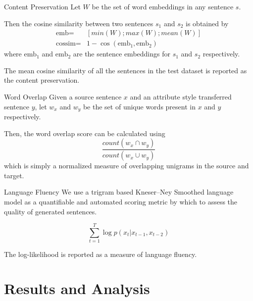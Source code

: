 \documentclass[aspectratio=169]{beamer}
\begin{document}
\begin{frame}{Content Preservation}
	Let $W$ be the set of word embeddings in any sentence $s$.

	Then the cosine similarity between two sentences $s_1$ and $s_2$ is obtained by
	\begin{align*}
		\text{emb} =    & [min(W);max(W);mean(W)]              \\
		\text{cossim} = & 1 - \cos(\text{emb}_1, \text{emb}_2)
	\end{align*}
	where $\text{emb}_1$ and $\text{emb}_2$ are the sentence embeddings for $s_1$ and $s_2$ respectively.

	The mean cosine similarity of all the sentences in the test dataset is reported as the content preservation.
\end{frame}

\begin{frame}{Word Overlap}
	Given a source sentence $x$ and an attribute style transferred sentence $y$, let $w_x$ and $w_y$ be the set of unique words present in $x$ and $y$ respectively.

	Then, the word overlap score can be calculated using
	\begin{equation*}
		\frac{count(w_x \cap w_y)}{count(w_x \cup w_y)}
	\end{equation*}
	which is simply a normalized measure of overlapping unigrams in the source and target.
\end{frame}

\begin{frame}{Language Fluency}
	We use a trigram based Kneser–Ney Smoothed language model \citep{kneser1995improved} as a quantifiable and automated scoring metric by which to assess the quality of generated sentences.

	\begin{equation*}
		\sum_{t=1}^T \log p(x_t | x_{t-1}, x_{t-2})
	\end{equation*}

	The log-likelihood is reported as a measure of language fluency.
\end{frame}

% 

\section{Results and Analysis}
\end{document}
